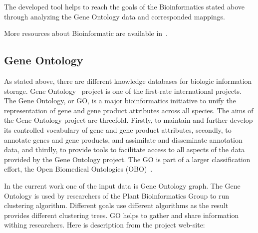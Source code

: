The developed tool helps to reach the goals of the Bioinformatics stated above through analyzing the Gene Ontology data and corresponded mappings.

More resources about Bioinformatic are available in~\cite{Bioinformatic_resources}.

\subsection{Gene Ontology}
\label{sec:gene_ontology}

As stated above, there are different knowledge databases for biologic information storage.
Gene Ontology~\cite{GO_website} project is one of the first-rate international projects.
The Gene Ontology, or GO, is a major bioinformatics initiative to unify the representation of gene and gene product attributes across all species.
The aims of the Gene Ontology project are threefold. Firstly, to maintain and further develop its controlled vocabulary of gene and gene product attributes,
secondly, to annotate genes and gene products, and assimilate and disseminate annotation data,
and thirdly, to provide tools to facilitate access to all aspects of the data provided by the Gene Ontology project. The GO is part of a larger classification effort, the Open Biomedical Ontologies (OBO)~\cite{OBO}.

In the current work one of the input data is Gene Ontology graph. The Gene Ontology is used by researchers of the Plant Bioinformatics Group to run clustering algorithm. Different goals use different algorithms as the result provides different clustering trees. GO helps to gather and share information withing researchers. Here is description from the project web-site:

